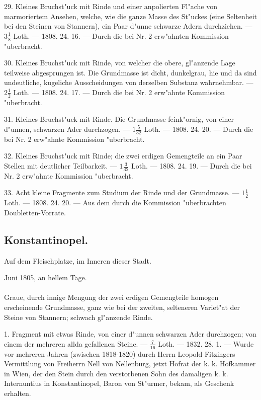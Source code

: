 \documentclass[a4paper, 11pt, oneside, polutonikogreek, german]{article}
\begin{document}
29. Kleines Bruchst"uck mit Rinde und einer anpolierten Fl"ache von marmoriertem Ansehen, welche, wie die ganze Masse des St"uckes (eine Seltenheit bei den Steinen von Stannern), ein Paar d"unne schwarze Adern durchziehen. --- $3\frac{1}{8}$ Loth. --- 1808. 24. 16. --- Durch die bei Nr. 2 erw"ahnten Kommission "uberbracht.

30. Kleines Bruchst"uck mit Rinde, von welcher die obere, gl"anzende Lage teilweise abgesprungen ist. Die Grundmasse ist dicht, dunkelgrau, hie und da sind undeutliche, kugeliche Ausscheidungen von derselben Substanz wahrnehmbar. --- $2\frac{1}{2}$ Loth. --- 1808. 24. 17. --- Durch die bei Nr. 2 erw"ahnte Kommission "uberbracht.

31. Kleines Bruchst"uck mit Rinde. Die Grundmasse feink"ornig, von einer d"unnen, schwarzen Ader durchzogen. --- $1\frac{5}{32}$ Loth. --- 1808. 24. 20. --- Durch die bei Nr. 2 erw"ahnte Kommission "uberbracht.

32. Kleines Bruchst"uck mit Rinde; die zwei erdigen Gemengteile an ein Paar Stellen mit deutlicher Teilbarkeit. --- $1\frac{3}{32}$ Loth. --- 1808. 24. 19. --- Durch die bei Nr. 2 erw"ahnte Kommission "uberbracht.

33. Acht kleine Fragmente zum Studium der Rinde und der Grundmasse. --- $1\frac{1}{2}$ Loth. --- 1808. 24. 20. --- Aus dem durch die Kommission "uberbrachten Doubletten-Vorrate.
\subsection{Konstantinopel.}
\begin{center}
\small
Auf dem Fleischplatze, im Inneren dieser Stadt.

Juni 1805, an hellem Tage.
\end{center}
\paragraph{}
Graue, durch innige Mengung der zwei erdigen Gemengteile homogen erscheinende Grundmasse, ganz wie bei der zweiten, selteneren Variet"at der Steine von Stannern; schwach gl"anzende Rinde.

1. Fragment mit etwas Rinde, von einer d"unnen schwarzen Ader durchzogen; von einem der mehreren allda gefallenen Steine. --- $\frac{7}{16}$ Loth. --- 1832. 28. 1. --- Wurde vor mehreren Jahren (zwischen 1818-1820) durch Herrn Leopold Fitzingers Vermittlung von Freiherrn Nell von Nellenburg, jetzt Hofrat der k. k. Hofkammer in Wien, der den Stein durch den verstorbenen Sohn des damaligen k. k. Internuntius in Konstantinopel, Baron von St"urmer, bekam, als Geschenk erhalten.
\end{document}
